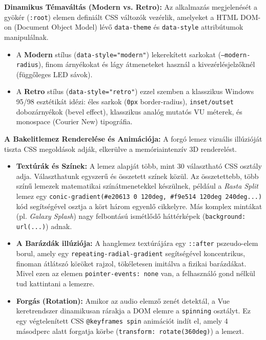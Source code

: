 \textbf{Dinamikus Témaváltás (Modern vs. Retro):}
Az alkalmazás megjelenését a gyökér (\texttt{:root}) elemen definiált CSS változók vezérlik, amelyeket a HTML DOM-on (Document Object Model) lévő \texttt{data-theme} és \texttt{data-style} attribútumok manipulálnak. 
\begin{itemize}
    \item A \textbf{Modern} stílus (\texttt{data-style="modern"}) lekerekített sarkokat (\texttt{--modern-radius}), finom árnyékokat és lágy átmeneteket használ a kivezérlésjelzőknél (függőleges LED sávok).
    \item A \textbf{Retro} stílus (\texttt{data-style="retro"}) ezzel szemben a klasszikus Windows 95/98 esztétikát idézi: éles sarkok (\texttt{0px} border-radius), \texttt{inset/outset} dobozárnyékok (bevel effect), klasszikus analóg mutatós VU méterek, és monospace (Courier New) tipográfia.
\end{itemize}

\textbf{A Bakelitlemez Renderelése és Animációja:}
A forgó lemez vizuális illúzióját tiszta CSS megoldások adják, elkerülve a memóriaintenzív 3D renderelést.
\begin{itemize}
    \item \textbf{Textúrák és Színek:} A lemez alapját több, mint 30 választható CSS osztály adja. Választhatunk egyszerű és összetett színek közül. Az összetettebb, több színű lemezek matematikai színátmenetekkel készülnek, például a \textit{Rasta Split} lemez egy \texttt{conic-gradient(\#e20613 0 120deg, \#f9e514 120deg 240deg...)} kód segítségével osztja a kört három egyenlő cikkelyre. Más komplex mintákat (pl. \textit{Galaxy Splash}) nagy felbontású ismétlődő háttérképek (\texttt{background: url(...)}) adnak.
    \item \textbf{A Barázdák illúziója:} A hanglemez textúrájára egy \texttt{::after} pszeudo-elem borul, amely egy \texttt{repeating-radial-gradient} segítségével koncentrikus, finoman átlátszó köröket rajzol, tökéletesen imitálva a fizikai barázdákat. Mivel ezen az elemen \texttt{pointer-events: none} van, a felhasználó gond nélkül tud kattintani a lemezre.
    \item \textbf{Forgás (Rotation):} Amikor az audio elemző zenét detektál, a Vue keretrendszer dinamikusan rárakja a DOM elemre a \texttt{spinning} osztályt. Ez egy végtelenített CSS \texttt{@keyframes spin} animációt indít el, amely 4 másodperc alatt forgatja körbe (\texttt{transform: rotate(360deg)}) a lemezt.
\end{itemize}

